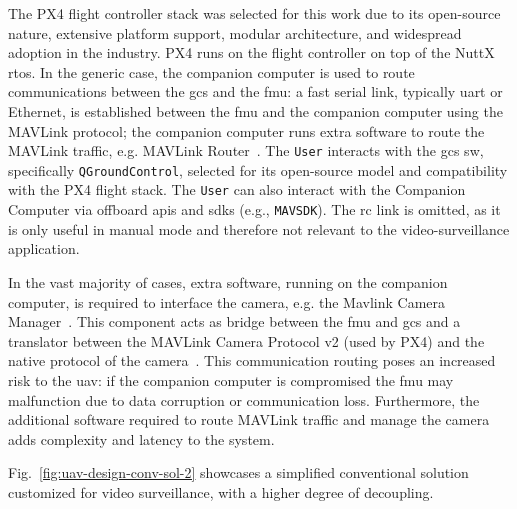 The PX4 flight controller stack was selected for this work due to its
open-source nature, extensive platform support, modular architecture, and
widespread adoption in the industry. PX4 runs on the flight controller on top of
the NuttX \gls{rtos}. In the generic case, the companion computer is used to
route communications between the \gls{gcs} and the \gls{fmu}: a fast serial
link, typically \gls{uart} or Ethernet, is established between the \gls{fmu} and
the companion computer using the MAVLink protocol; the companion computer
runs extra software to route the MAVLink traffic,
e.g. MAVLink Router~\cite{px4-routers}.
%
The \lstinline{User} interacts with the \gls{gcs} \gls{sw}, specifically
\lstinline{QGroundControl}, selected for its open-source model and compatibility
with the PX4 flight stack. The \lstinline{User} can also interact with the
Companion Computer via offboard \glspl{api} and \glspl{sdk} (e.g.,
\lstinline{MAVSDK}). The \gls{rc} link is omitted, as it is only useful in
manual mode and therefore not relevant to the video-surveillance application.

In the vast majority of cases, extra software, running on the companion
computer, is required to interface the camera, e.g. the Mavlink Camera Manager~\cite{px4-cam-managers}. This
component acts as bridge between the \gls{fmu} and \gls{gcs} and a translator between the MAVLink Camera Protocol v2
(used by PX4) and the native protocol of the camera~\cite{px4-cam-managers}.
%
This communication routing poses an increased risk to the \gls{uav}: if the
companion computer is compromised the \gls{fmu} may malfunction due to data
corruption or communication loss. Furthermore, the additional software required
to route MAVLink traffic and manage the camera adds complexity and latency to
the system.

Fig.~\ref{fig:uav-design-conv-sol-2} showcases a simplified conventional
solution customized for video surveillance, with a higher degree of
decoupling.

